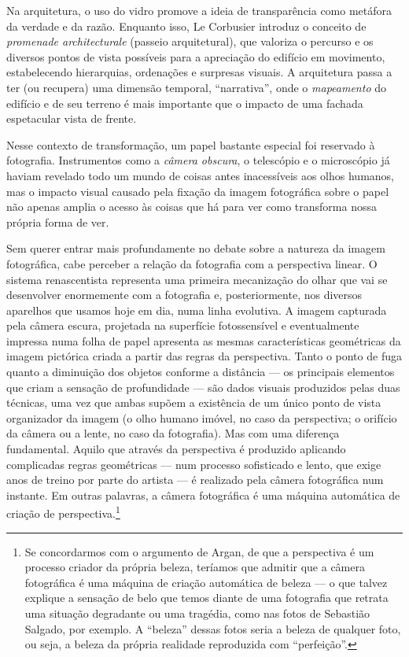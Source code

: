Na arquitetura, o uso do vidro promove a ideia de transparência como
metáfora da verdade e da razão. Enquanto isso, Le Corbusier introduz o
conceito de \emph{promenade architecturale} (passeio arquitetural), que
valoriza o percurso e os diversos pontos de vista possíveis para a
apreciação do edifício em movimento, estabelecendo hierarquias,
ordenações e surpresas visuais. A arquitetura passa a ter (ou recupera)
uma dimensão temporal, ``narrativa'', onde o \emph{mapeamento} do
edifício e de seu terreno é mais importante que o impacto de uma fachada
espetacular vista de frente.

Nesse contexto de transformação, um papel bastante especial foi
reservado à fotografia. Instrumentos como a \emph{câmera obscura}, o
telescópio e o microscópio já haviam revelado todo um mundo de coisas
antes inacessíveis aos olhos humanos, mas o impacto visual causado pela
fixação da imagem fotográfica sobre o papel não apenas amplia o acesso
às coisas que há para ver como transforma nossa própria forma de ver.

Sem querer entrar mais profundamente no debate sobre a natureza da
imagem fotográfica, cabe perceber a relação da fotografia com a
perspectiva linear. O sistema renascentista representa uma primeira
mecanização do olhar que vai se desenvolver enormemente com a fotografia
e, posteriormente, nos diversos aparelhos que usamos hoje em dia, numa
linha evolutiva. A imagem capturada pela câmera escura, projetada na
superfície fotossensível e eventualmente impressa numa folha de papel
apresenta as mesmas características geométricas da imagem pictórica
criada a partir das regras da perspectiva. Tanto o ponto de fuga quanto
a diminuição dos objetos conforme a distância --- os principais elementos
que criam a sensação de profundidade --- são dados visuais produzidos
pelas duas técnicas, uma vez que ambas supõem a existência de um único
ponto de vista organizador da imagem (o olho humano imóvel, no caso da
perspectiva; o orifício da câmera ou a lente, no caso da fotografia).
Mas com uma diferença fundamental. Aquilo que através da perspectiva é
produzido aplicando complicadas regras geométricas --- num processo
sofisticado e lento, que exige anos de treino por parte do artista --- é
realizado pela câmera fotográfica num instante. Em outras palavras, a
câmera fotográfica é uma máquina automática de criação de
perspectiva.\footnote{Se concordarmos com o argumento de Argan, de que a
  perspectiva é um processo criador da própria beleza, teríamos que
  admitir que a câmera fotográfica é uma máquina de criação automática
  de beleza --- o que talvez explique a sensação de belo que temos diante
  de uma fotografia que retrata uma situação degradante ou uma tragédia,
  como nas fotos de Sebastião Salgado, por exemplo. A ``beleza'' dessas
  fotos seria a beleza de qualquer foto, ou seja, a beleza da própria
  realidade reproduzida com ``perfeição''.}

